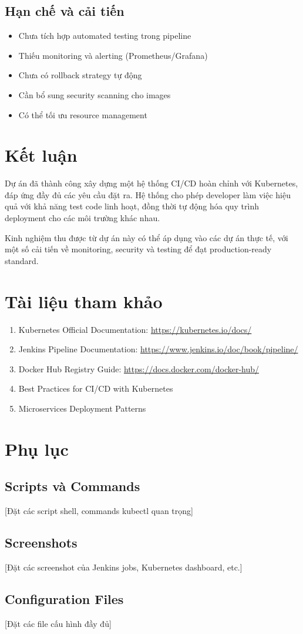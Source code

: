 \documentclass[12pt,a4paper]{article}
\begin{document}
\subsection{Hạn chế và cải tiến}
\begin{itemize}
    \item Chưa tích hợp automated testing trong pipeline
    \item Thiếu monitoring và alerting (Prometheus/Grafana)
    \item Chưa có rollback strategy tự động
    \item Cần bổ sung security scanning cho images
    \item Có thể tối ưu resource management
\end{itemize}

\section{Kết luận}

Dự án đã thành công xây dựng một hệ thống CI/CD hoàn chỉnh với Kubernetes, đáp ứng đầy đủ các yêu cầu đặt ra. Hệ thống cho phép developer làm việc hiệu quả với khả năng test code linh hoạt, đồng thời tự động hóa quy trình deployment cho các môi trường khác nhau.

Kinh nghiệm thu được từ dự án này có thể áp dụng vào các dự án thực tế, với một số cải tiến về monitoring, security và testing để đạt production-ready standard.

\section{Tài liệu tham khảo}

\begin{enumerate}
    \item Kubernetes Official Documentation: \url{https://kubernetes.io/docs/}
    \item Jenkins Pipeline Documentation: \url{https://www.jenkins.io/doc/book/pipeline/}
    \item Docker Hub Registry Guide: \url{https://docs.docker.com/docker-hub/}
    \item Best Practices for CI/CD with Kubernetes
    \item Microservices Deployment Patterns
\end{enumerate}

\appendix
\section{Phụ lục}

\subsection{Scripts và Commands}
[Đặt các script shell, commands kubectl quan trọng]

\subsection{Screenshots}
[Đặt các screenshot của Jenkins jobs, Kubernetes dashboard, etc.]

\subsection{Configuration Files}
[Đặt các file cấu hình đầy đủ]
\end{document}
